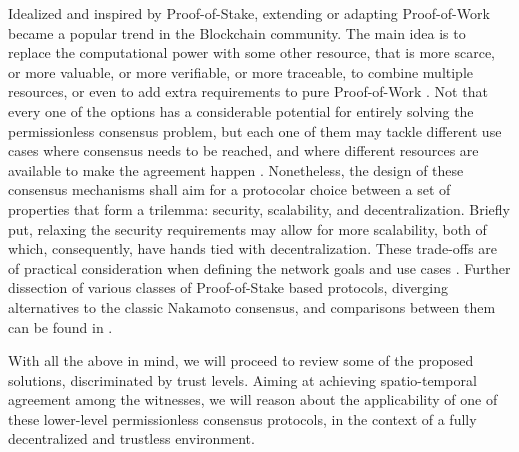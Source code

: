 Idealized and inspired by Proof-of-Stake, extending or adapting Proof-of-Work became a popular trend in the Blockchain community. The main idea is to replace the computational power with some other resource, that is more scarce, or more valuable, or more verifiable, or more traceable, to combine multiple resources, or even to add extra requirements to pure Proof-of-Work \cite{survey-dist-consensus}. Not that every one of the options has a considerable potential for entirely solving the permissionless consensus problem, but each one of them may tackle different use cases where consensus needs to be reached, and where different resources are available to make the agreement happen \cite{BOURAGA2021114384, 9376868}. Nonetheless, the design of these consensus mechanisms shall aim for a protocolar choice between a set of properties that form a trilemma: security, scalability, and decentralization. Briefly put, relaxing the security requirements may allow for more scalability, both of which, consequently, have hands tied with decentralization. These trade-offs are of practical consideration when defining the network goals and use cases \cite{survey-dist-consensus}. Further dissection of various classes of Proof-of-Stake based protocols, diverging alternatives to the classic Nakamoto consensus, and comparisons between them can be found in \cite{8629877, survey-dist-consensus, BOURAGA2021114384, 9376868, natoli2019deconstructing}.

With all the above in mind, we will proceed to review some of the proposed \pol{} solutions, discriminated by trust levels. Aiming at achieving spatio-temporal agreement among the witnesses, we will reason about the applicability of one of these lower-level permissionless consensus protocols, in the context of a fully decentralized and trustless environment.